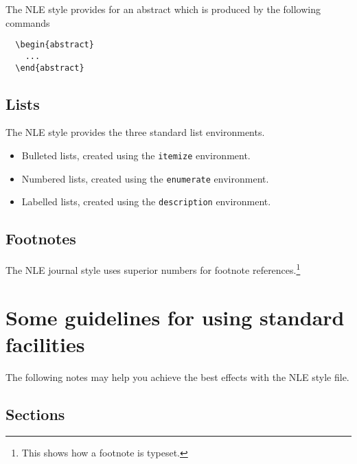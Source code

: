 \documentclass{nle}
\begin{document}
The NLE style provides for an abstract which is produced by the following
commands
%
\begin{verbatim}
  \begin{abstract}
    ...
  \end{abstract}
\end{verbatim}

\subsection{Lists}

The NLE style provides the three standard list environments.
\begin{itemize}
  \item Bulleted lists, created using the \verb"itemize" environment.
  \item Numbered lists, created using the \verb"enumerate" environment.
  \item Labelled lists, created using the \verb"description" environment.
\end{itemize}

\subsection{Footnotes}

The NLE journal style uses superior numbers for footnote
references.\footnote{This shows how a footnote is typeset.}

\section{Some guidelines for using standard facilities}

The following notes may help you achieve the best effects with the NLE style
file.

\subsection{Sections}
\end{document}
